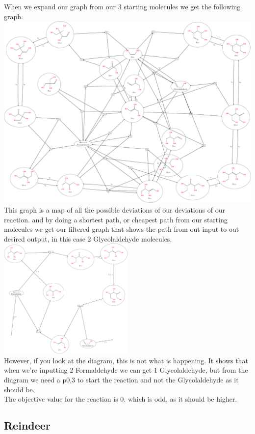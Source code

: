 \documentclass[a4paper,10pt,titlepage]{report}
\begin{document}
When we expand our graph from our 3 starting molecules we get the following graph. \\
\includegraphics[width=1\textwidth, angle=0]{hyper.pdf}
\\
This graph is a map of all the possible deviations of our deviations of our reaction. and by doing a shortest path, or cheapest path from our starting molecules we get our filtered graph that shows the path from out input to out desired output, in this case 2 Glycolaldehyde molecules.
\\
\includegraphics[width=0.5\textwidth, angle=0]{045.pdf}
\\
However, if you look at the diagram, this is not what is happening. It shows that when we're inputting 2 Formaldehyde we can get 1 Glycolaldehyde, but from the diagram we need a p0,3 to start the reaction and not the Glycolaldehyde as it should be.
\\
The objective value for the reaction is 0. which is odd, as it should be higher.

\subsection{Reindeer}
\end{document}
